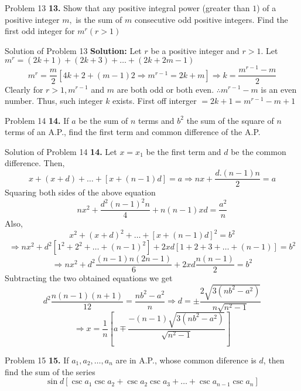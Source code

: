 \documentclass[aspectratio=1610,8pt]{beamer}
\begin{document}
\begin{frame}{Problem 13}
  \textbf{13.} Show that any positive integral power (greater than $1$) of a positive integer $m,$ is the sum of $m$ consecutive
  odd positive integers. Find the first odd integer for $m^r(r > 1)$
\end{frame}
\begin{frame}{Solution of Problem 13}
  \textbf{Solution:} Let $r$ be a positive integer and $r > 1.$
  \linebreak\linebreak
  Let $m^r = (2k + 1)+ (2k + 3) + \ldots + (2k + 2m - 1)$
  $$m^r = \frac{m}{2}[4k + 2 + (m - 1)2 \Rightarrow m^{r - 1} = 2k + m] \Rightarrow k = \frac{m^{r - 1} - m}{2}$$
  Clearly for $r > 1, m^{r - 1}$ and $m$ are both odd or both even. $\therefore m^{r - 1} - m$ is an even number. Thus, such
  integer $k$ exists.
  \linebreak\linebreak
  First off interger $= 2k + 1 = m^{r - 1} - m + 1$
\end{frame}
\begin{frame}{Problem 14}
  \textbf{14.} If $a$ be the sum of $n$ terms and $b^2$ the sum of the square of $n$ terms of an A.P., find the first term and
  common difference of the A.P.
\end{frame}
\begin{frame}{Solution of Problem 14}
  \textbf{14.} Let $x = x_1$ be the first term and $d$ be the common difference. Then,
  $$x + (x + d) + \ldots + [x + (n - 1)d] = a \Rightarrow nx + \frac{d.(n - 1)n}{2} = a$$
  Squaring both sides of the above equation
  $$nx^2 + \frac{d^2(n - 1)^2n}{4} + n(n - 1)xd = \frac{a^2}{n}$$
  Also,
  $$x^2 + (x + d)^2 + \ldots + [x + (n - 1)d]^2 = b^2$$
  $$\Rightarrow nx^2 + d^2[1^2 + 2^2 + \ldots + (n - 1)^2] + 2xd[1 + 2 + 3 + \ldots + (n - 1)]= b^2$$
  $$\Rightarrow nx^2 + d^2\frac{(n - 1)n(2n - 1)}{6} + 2xd\frac{n(n - 1)}{2} = b^2$$
  Subtracting the two obtained equations we get
  $$d^2\frac{n(n - 1)(n + 1)}{12} = \frac{nb^2 - a^2}{n}\Rightarrow d = \pm \frac{2\sqrt{3(nb^2 - a^2)}}{n\sqrt{n^2 - 1}}$$
  $$\Rightarrow x = \frac{1}{n}\left[a\mp \frac{-(n - 1)\sqrt{3(nb^2 - a^2)}}{\sqrt{n^2 - 1}}\right]$$
\end{frame}
\begin{frame}{Problem 15}
  \textbf{15.} If $a_1, a_2, \ldots, a_n$ are in A.P., whose common diference is $d$, then find the sum of the series $$\sin
  d[\csc a_1\csc a_2 + \csc a_2\csc a_3 + \ldots + \csc a_{n - 1}\csc a_n]$$
\end{frame}
\end{document}
